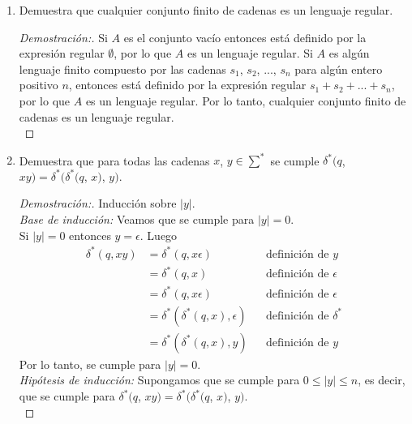 \documentclass[letterpaper,11pt]{article}
\begin{document}
\begin{enumerate}
\item Demuestra que cualquier conjunto finito de cadenas es un lenguaje regular.
  \begin{proof}[Demostración:]
    Si $A$ es el conjunto vacío entonces está definido por la expresión regular
    $\emptyset$, por lo que $A$ es un lenguaje regular. Si $A$ es algún lenguaje
    finito compuesto por las cadenas $s_{1}$, $s_{2}$, $...$, $s_{n}$ para algún
    entero positivo $n$, entonces está definido por la expresión regular
    $s_{1} + s_{2} + ... + s_{n}$, por lo que $A$ es un lenguaje 
regular.
    Por lo tanto, cualquier conjunto finito de cadenas es un lenguaje regular.\\
  \end{proof}

  \item Demuestra que para todas las cadenas $x$, $y \in \sum^{*}$ se cumple
  $\delta^{*}(q$, $xy) = \delta^{*}(\delta^{*}(q$, $x)$, $y)$.
  \begin{proof}[Demostración:]
    Inducción sobre $|y|$.\\
    \textit{Base de inducción: } Veamos que se cumple para $|y| = 0$.\\
    Si $|y| = 0$ entonces $y = \epsilon$. Luego
    \begin{align*}
    \delta^{*}(q, xy) &= \delta^{*}(q, x \epsilon) && \text{definición de $y$}\\
                      &= \delta^{*}(q, x) && \text{definición de $\epsilon$}\\
                      &= \delta^{*}(q, x \epsilon) && \text{definición de $\epsilon$}\\
                      &= \delta^{*}(\delta^{*}(q,x), \epsilon) && \text{definición de $\delta^{*}$}\\
                      &=  \delta^{*}(\delta^{*}(q,x), y) && \text{definición de $y$}
    \end{align*}
    Por lo tanto, se cumple para $|y| = 0$.\\ 
    
    \textit{Hipótesis de inducción: } Supongamos que se cumple para
    $0 \leq |y| \leq n$, es decir, que se cumple para
    $\delta^{*}(q$, $xy) = \delta^{*}(\delta^{*}(q$, $x)$, $y)$. \\


\end{proof}
\end{enumerate}
\end{document}
